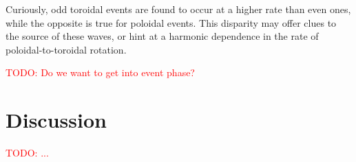 \documentclass{article}
\newcommand{\todo}[1]{ \textcolor{red}{TODO: #1} }
\begin{document}
Curiously, odd toroidal events are found to occur at a higher rate than even ones, while the opposite is true for poloidal events. This disparity may offer clues to the source of these waves, or hint at a harmonic dependence in the rate of poloidal-to-toroidal rotation.

\todo{Do we want to get into event phase?}



\section{Discussion}

\todo{...}






\end{document}
